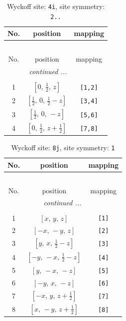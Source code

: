 \documentclass[fleqn,8pt]{jsarticle}
\begin{document}
\renewcommand{\arraystretch}{1.2}
\begin{longtable}{ccc}
\caption{Wyckoff site: {\tt 4i}, site symmetry: {\tt 2..}}
 \\
 \hline \hline
No. & position & mapping \\ \hline \endfirsthead

\multicolumn{2}{l}{\tablename\ \thetable{}} \\
 \hline \hline
No. & position & mapping \\ \hline \endhead

 \hline \hline
\multicolumn{2}{r}{\footnotesize\it continued ...} \\ \endfoot

 \hline \hline
\multicolumn{2}{r}{} \\ \endlastfoot

1 & $\left[ 0,\, \frac{1}{2},\, z \right]$ & {\tt [1,2]} \\ \hline
2 & $\left[ \frac{1}{2},\, 0,\, \frac{1}{2} - z \right]$ & {\tt [3,4]} \\ \hline
3 & $\left[ \frac{1}{2},\, 0,\, - z \right]$ & {\tt [5,6]} \\ \hline
4 & $\left[ 0,\, \frac{1}{2},\, z + \frac{1}{2} \right]$ & {\tt [7,8]} \\
\end{longtable}
\renewcommand{\arraystretch}{1.2}
\begin{longtable}{ccc}
\caption{Wyckoff site: {\tt 8j}, site symmetry: {\tt 1}}
 \\
 \hline \hline
No. & position & mapping \\ \hline \endfirsthead

\multicolumn{2}{l}{\tablename\ \thetable{}} \\
 \hline \hline
No. & position & mapping \\ \hline \endhead

 \hline \hline
\multicolumn{2}{r}{\footnotesize\it continued ...} \\ \endfoot

 \hline \hline
\multicolumn{2}{r}{} \\ \endlastfoot

1 & $\left[ x,\, y,\, z \right]$ & {\tt [1]} \\ \hline
2 & $\left[ - x,\, - y,\, z \right]$ & {\tt [2]} \\ \hline
3 & $\left[ y,\, x,\, \frac{1}{2} - z \right]$ & {\tt [3]} \\ \hline
4 & $\left[ - y,\, - x,\, \frac{1}{2} - z \right]$ & {\tt [4]} \\ \hline
5 & $\left[ y,\, - x,\, - z \right]$ & {\tt [5]} \\ \hline
6 & $\left[ - y,\, x,\, - z \right]$ & {\tt [6]} \\ \hline
7 & $\left[ - x,\, y,\, z + \frac{1}{2} \right]$ & {\tt [7]} \\ \hline
8 & $\left[ x,\, - y,\, z + \frac{1}{2} \right]$ & {\tt [8]} \\
\end{longtable}
\end{document}
